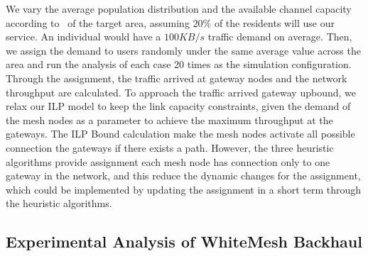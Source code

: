 We vary the average population distribution and the available channel capacity according to~\cite{pcuiwinmee}
 of the target area, assuming $20\%$ of the residents will use
our service. An individual would have a $100 KB/s$ traffic demand on average. 
Then, we assign the demand to users randomly under the same average value across the area and run the analysis 
of each case 20 times as the simulation configuration. Through the assignment, the traffic arrived at gateway nodes
and the network throughput are calculated.
To approach the traffic arrived gateway upbound, we relax our ILP model to keep the link capacity constraints, 
given the demand of the mesh nodes as a parameter to achieve the maximum throughput at the gateways. 
The ILP Bound calculation make the mesh nodes activate all possible connection the gateways if 
there exists a path.
However, the three heuristic algorithms provide assignment each mesh node has connection only to one 
gateway in the network, and this reduce the dynamic changes for the assignment, which could be implemented
by updating the assignment in a short term through the heuristic algorithms.

\subsection{Experimental Analysis of WhiteMesh Backhaul}
\label{subsec:analysis}

